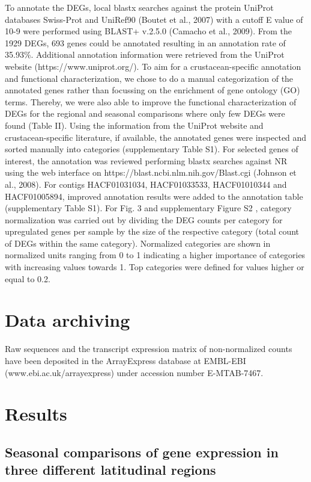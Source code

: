 To annotate the DEGs, local blastx searches against the protein UniProt databases Swiss-Prot and UniRef90 (Boutet et al., 2007) with a cutoff E value of 10-9 were performed using BLAST+ v.2.5.0 (Camacho et al., 2009). From the 1929 DEGs, 693 genes could be annotated resulting in an annotation rate of 35.93\%. Additional annotation information were retrieved from the UniProt website (https://www.uniprot.org/). To aim for a crustacean-specific annotation and functional characterization, we chose to do a manual categorization of the annotated genes rather than focussing on the enrichment of gene ontology (GO) terms. Thereby, we were also able to improve the functional characterization of DEGs for the regional and seasonal comparisons where only few DEGs were found (Table II). Using the information from the UniProt website and crustacean-specific literature, if available, the annotated genes were inspected and sorted manually into categories (supplementary Table S1). For selected genes of interest, the annotation was reviewed performing blastx searches against NR using the web interface on https://blast.ncbi.nlm.nih.gov/Blast.cgi  (Johnson et al., 2008). For contigs HACF01031034, HACF01033533, HACF01010344 and HACF01005894, improved annotation results were added to the annotation table (supplementary Table S1). For Fig. 3 and supplementary Figure S2 , category normalization was carried out by dividing the DEG counts per category for upregulated genes per sample by the size of the respective category (total count of DEGs within the same category). Normalized categories are shown in normalized units ranging from 0 to 1 indicating a higher importance of categories with increasing values towards 1. Top categories were defined for values higher or equal to 0.2.

\section{Data archiving}
Raw sequences and the transcript expression matrix of non-normalized counts have been deposited in the ArrayExpress database at EMBL-EBI (www.ebi.ac.uk/arrayexpress) under accession number E-MTAB-7467.  

\section{Results}

\subsection{Seasonal comparisons of gene expression in three different latitudinal regions}

